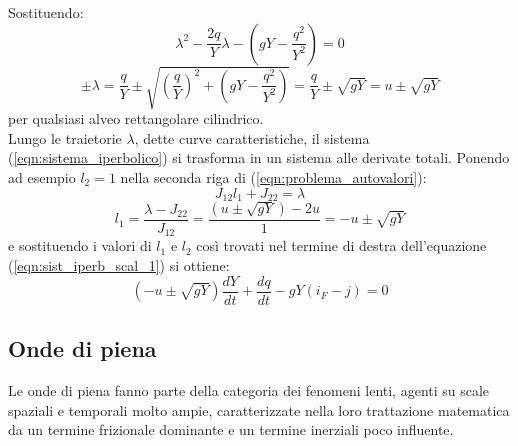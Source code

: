 \documentclass[12pt]{article} %
\begin{document}
\noindent Sostituendo:
\begin{equation}
    \lambda^2-\frac{2q}{Y}\lambda -\left(gY-\frac{q^2}{Y^2}\right) = 0
\end{equation}
\begin{equation}
    \pm\lambda = \frac{q}{Y}\pm\sqrt{\left(\frac{q}{Y}\right)^2+\left(gY-\frac{q^2}{Y^2}\right)}=\frac{q}{Y}\pm\sqrt{gY}=u\pm\sqrt{gY}
\end{equation}
\noindent per qualsiasi alveo rettangolare cilindrico.\\
\noindent Lungo le traietorie $\lambda$, dette curve caratteristiche, il sistema (\ref{eqn:sistema_iperbolico}) si trasforma in un sistema alle derivate totali.
\noindent Ponendo ad esempio $l_2=1$ nella seconda riga di (\ref{eqn:problema_autovalori}):
\begin{equation}
    J_{12}l_1 + J_{22}=\lambda
\end{equation}
\begin{equation}
    l_1  =\frac{\lambda-J_{22}}{J_{12}}=\frac{\left(u\pm\sqrt{gY}\right)-2u}{1}=-u\pm\sqrt{gY} 
\end{equation}
\noindent e sostituendo i valori di $l_1$ e $l_2$ così trovati nel termine di destra dell'equazione (\ref{eqn:sist_iperb_scal_1}) si ottiene:
\begin{equation}
    \left(-u\pm\sqrt{gY}\right)\frac{dY}{dt}+\frac{dq}{dt}-gY\left(i_F-j\right)=0
    \label{eqn:forma_caratteristica}
\end{equation}

\subsection{Onde di piena}
\noindent Le onde di piena fanno parte della categoria dei fenomeni lenti, agenti su scale spaziali e temporali molto ampie, caratterizzate nella loro trattazione matematica da un termine frizionale dominante e un termine inerziali poco influente.  
\end{document}
